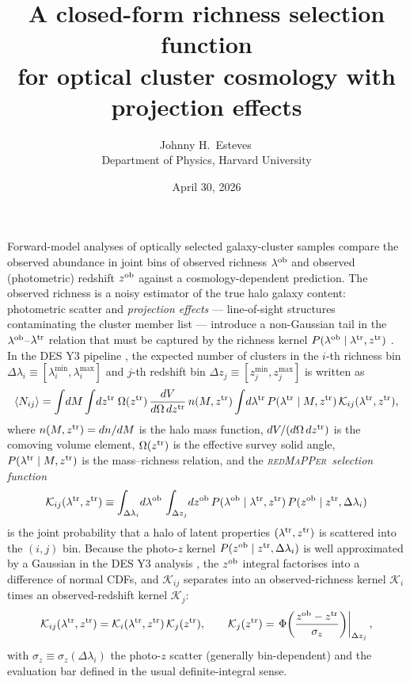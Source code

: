 \documentclass[a4paper, 11pt]{article}
\title{\textcolor{harvardcrimson}{\textbf{A closed-form richness selection function\\
for optical cluster cosmology with projection effects}}}
\author{Johnny H.\ Esteves\,\orcidlink{0000-0003-4373-2386}\\[2pt]
{\small Department of Physics, Harvard University}}
\date{April 30, 2026}
\newcommand{\ltr}{\lambda^{\rm tr}}
\newcommand{\lob}{\lambda^{\rm ob}}
\newcommand{\ztr}{z^{\rm tr}}
\newcommand{\zob}{z^{\rm ob}}
\newcommand{\redmapper}{\textsc{redMaPPer}}
\begin{document}
\maketitle
\thispagestyle{fancy}

Forward-model analyses of optically selected galaxy-cluster samples compare the observed abundance in joint bins of observed richness $\lob$ and observed (photometric) redshift $\zob$ against a cosmology-dependent prediction. The observed richness is a noisy estimator of the true halo galaxy content: photometric scatter and \emph{projection effects} --- line-of-sight structures contaminating the cluster member list --- introduce a non-Gaussian tail in the $\lob$--$\ltr$ relation that must be captured by the richness kernel $P(\lob\mid\ltr,\ztr)$ \citep[see e.g.][]{Costanzi2019proj,Costanzi2021,Costanzi2026}. In the DES Y3 pipeline \citep{Y3CosmoSISPlans}, the expected number of clusters in the $i$-th richness bin $\Delta\lambda_i\equiv[\lambda_i^{\min},\lambda_i^{\max}]$ and $j$-th redshift bin $\Delta z_j\equiv[z_j^{\min},z_j^{\max}]$ is written as
\begin{equation}
\langle N_{ij}\rangle
=
\int\! dM \int\! d\ztr\;
\Omega(\ztr)\,\frac{dV}{d\Omega\,d\ztr}\,n(M,\ztr)
\int\! d\ltr\,
P(\ltr\mid M,\ztr)\,
\mathcal K_{ij}(\ltr,\ztr),
\label{eq:Nij}
\end{equation}
where $n(M,\ztr)=dn/dM$ is the halo mass function, $dV/(d\Omega\,d\ztr)$ is the comoving volume element, $\Omega(\ztr)$ is the effective survey solid angle, $P(\ltr\mid M,\ztr)$ is the mass--richness relation, and the \emph{\redmapper\ selection function}
\begin{equation}
\mathcal K_{ij}(\ltr,\ztr)
\equiv
\int_{\Delta\lambda_i}\! d\lob\,
\int_{\Delta z_j}\! d\zob\,
P(\lob\mid \ltr,\ztr)\,
P(\zob\mid \ztr,\Delta\lambda_i)
\label{eq:Kij_def}
\end{equation}
is the joint probability that a halo of latent properties $(\ltr,\ztr)$ is scattered into the $(i,j)$ bin. Because the photo-$z$ kernel $P(\zob\mid\ztr,\Delta\lambda_i)$ is well approximated by a Gaussian in the DES Y3 analysis \citep[Eq.~66 of][]{Y3CosmoSISPlans}, the $\zob$ integral factorises into a difference of normal CDFs, and $\mathcal K_{ij}$ separates into an observed-richness kernel $\mathcal K_i$ times an observed-redshift kernel $\mathcal K_j$:
\begin{equation}
\mathcal K_{ij}(\ltr,\ztr) = \mathcal K_i(\ltr,\ztr)\,\mathcal K_j(\ztr),
\qquad
\mathcal K_j(\ztr) =
\left.\Phi\!\left(\frac{\zob-\ztr}{\sigma_z}\right)\right|_{\Delta z_j},
\label{eq:Kij_split}
\end{equation}
with $\sigma_z\equiv\sigma_z(\Delta\lambda_i)$ the photo-$z$ scatter (generally bin-dependent) and the evaluation bar defined in the usual definite-integral sense.
\end{document}
